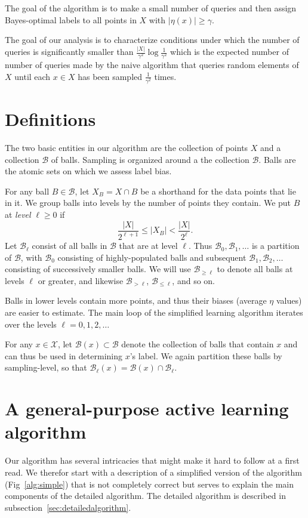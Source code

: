\documentclass[twoside]{article}
\def\X{{\mathcal X}}
\def\B{{\mathcal B}}
\begin{document}
The goal of the algorithm is to make a small number of queries and then
assign Bayes-optimal labels to all points in $X$ with $|\eta(x)| \geq \gamma$.

The goal of our analysis is to characterize conditions under which the
number of queries is significantly smaller than
$\frac{|X|}{\gamma^2}\log \frac{1}{\gamma^2}$ which is the expected
  number of number of queries made by the naive algorithm that queries
  random elements of $X$ until each $x \in X$ has been sampled
  $\frac{1}{\gamma^2}$ times.

\section{Definitions}

The two basic entities in our algorithm are the collection of points
$X$ and a collection $\B$ of balls. Sampling is organized around a the
collection $\B$. Balls are the atomic sets on which we assess label
bias.

For any ball $B \in \B$, let $X_B = X \cap B$ be a shorthand for the
data points that lie in it.  We group balls into levels by the number
of points they contain. We put $B$ at {\it level} $\ell \geq 0$ if
\begin{equation}
\frac{|X|}{2^{\ell + 1}} \leq |X_B| < \frac{|X|}{2^\ell} .
\label{eq:sampling-level}
\end{equation}
Let $\B_\ell$ consist of all balls in $\B$ that are at level
$\ell$. Thus $\B_0, \B_1, \ldots$ is a partition of $\B$, with $\B_0$
consisting of highly-populated balls and subsequent
$\B_1, \B_2, \ldots$ consisting of successively smaller balls. We will
use $\B_{\geq \ell}$ to denote all balls at levels $\ell$ or greater,
and likewise $\B_{> \ell}$, $\B_{\leq \ell}$, and so on.

Balls in lower levels contain more points, and thus their biases
(average $\eta$ values) are easier to estimate. The main loop of the
simplified learning algorithm iterates over the levels $\ell=0,1,2,\ldots$

For any $x \in \X$, let $\B(x) \subset \B$ denote the collection of
balls that contain $x$ and can thus be used in determining $x$'s
label. We again partition these balls by sampling-level, so that
$\B_\ell(x) = \B(x) \cap \B_\ell$.

\section{A general-purpose active learning algorithm}
\label{sec:algorithm}
Our algorithm has several intricacies that might make it hard to
follow at a first read.  We therefor start with a description of a
simplified version of the algorithm (Fig~\ref{alg:simple}) that is not
completely correct but serves to explain the main components of the
detailed algorithm. The detailed algorithm is described in
subsection~\ref{sec:detailedalgorithm}.
\end{document}
